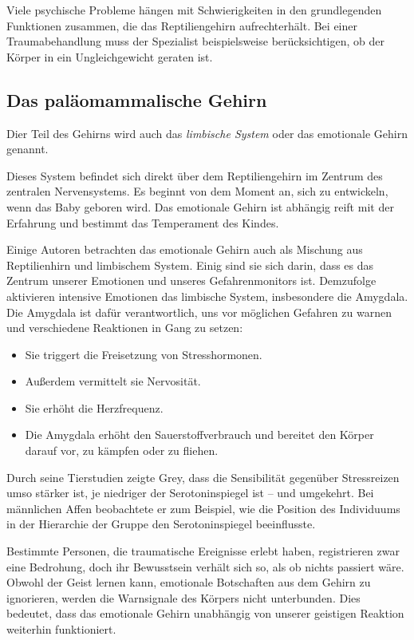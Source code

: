 \documentclass[
    invert-title=false,
    titlepage=true,
    titleimage-ratio=1011,
    parskip=half-,
]{bfhpub}                %
\begin{document}
    Viele psychische Probleme hängen mit Schwierigkeiten in den grundlegenden Funktionen zusammen, die das Reptiliengehirn aufrechterhält.
    Bei einer Traumabehandlung muss der Spezialist beispielsweise berücksichtigen, ob der Körper in ein Ungleichgewicht geraten ist.

    \subsection{Das paläomammalische Gehirn}\label{subsec:das-palaomammalische-gehirn}
    Dier Teil des Gehirns wird auch das \textit{limbische System} oder das emotionale Gehirn genannt.

    Dieses System befindet sich direkt über dem Reptiliengehirn im Zentrum des zentralen Nervensystems.
    Es beginnt von dem Moment an, sich zu entwickeln, wenn das Baby geboren wird.
    Das emotionale Gehirn ist abhängig reift mit der Erfahrung und bestimmt das Temperament des Kindes.

    Einige Autoren betrachten das emotionale Gehirn auch als Mischung aus Reptilienhirn und limbischem System.
    Einig sind sie sich darin, dass es das Zentrum unserer Emotionen und unseres Gefahrenmonitors ist.
    Demzufolge aktivieren intensive Emotionen das limbische System, insbesondere die Amygdala.
    Die Amygdala ist dafür verantwortlich, uns vor möglichen Gefahren zu warnen und verschiedene Reaktionen in Gang zu setzen:
    \begin{itemize}
        \item Sie triggert die Freisetzung von Stresshormonen.
        \item Außerdem vermittelt sie Nervosität.
        \item Sie erhöht die Herzfrequenz.
        \item Die Amygdala erhöht den Sauerstoffverbrauch und bereitet den Körper darauf vor, zu kämpfen oder zu fliehen.
    \end{itemize}

    Durch seine Tierstudien zeigte Grey, dass die Sensibilität gegenüber Stressreizen umso stärker ist, je niedriger der Serotoninspiegel ist – und umgekehrt.
    Bei männlichen Affen beobachtete er zum Beispiel, wie die Position des Individuums in der Hierarchie der Gruppe den Serotoninspiegel beeinflusste.

    Bestimmte Personen, die traumatische Ereignisse erlebt haben, registrieren zwar eine Bedrohung, doch ihr Bewusstsein verhält sich so, als ob nichts passiert wäre.
    Obwohl der Geist lernen kann, emotionale Botschaften aus dem Gehirn zu ignorieren, werden die Warnsignale des Körpers nicht unterbunden.
    Dies bedeutet, dass das emotionale Gehirn unabhängig von unserer geistigen Reaktion weiterhin funktioniert.
\end{document}
